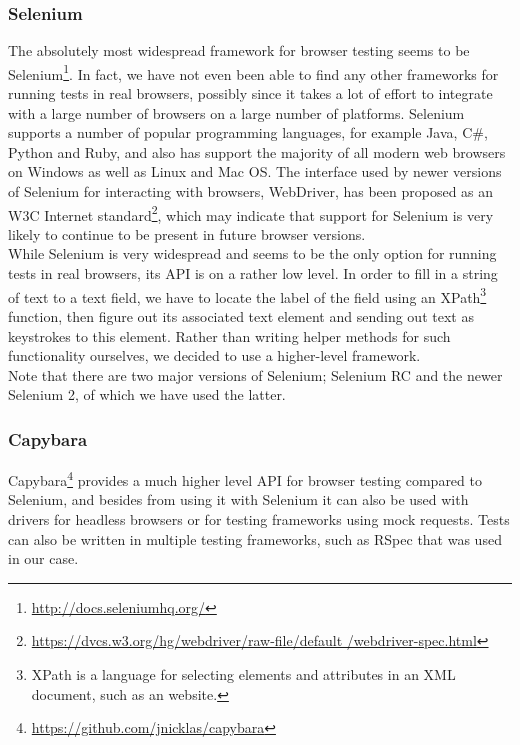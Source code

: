 \label{sec:choices_browser}

\subsubsection{Selenium}
The absolutely most widespread framework for browser testing seems to be
Selenium\footnote{\url{http://docs.seleniumhq.org/}}. In fact, we have
not even been able to find any other frameworks for running tests in
real browsers, possibly since it takes a lot of effort to integrate with
a large number of browsers on a large number of platforms. Selenium
supports a number of popular programming languages, for example Java,
C\#, Python and Ruby, and also has support the majority of all modern web
browsers on Windows as well as Linux and Mac OS. The interface used by
newer versions of Selenium for interacting with browsers, WebDriver, has
been proposed as an W3C Internet
standard\footnote{\url{https://dvcs.w3.org/hg/webdriver/raw-file/default
/webdriver-spec.html}}, which may indicate that support for Selenium
is very likely to continue to be present in future browser versions.
\cite{wiki:selenium}\\

While Selenium is very widespread and seems to be the only option for
running tests in real browsers, its API is on a rather low level. In
order to fill in a string of text to a text field, we have to locate the
label of the field using an XPath\footnote{XPath is a language for
selecting elements and attributes in an XML document, such as an
website.} function, then figure out its associated text element and
sending out text as keystrokes to this element. Rather than writing
helper methods for such functionality ourselves, we decided to use
a higher-level framework.\\

Note that there are two major versions of Selenium; Selenium RC
and the newer Selenium 2, of which we have used the latter.\\

\subsubsection{Capybara}
Capybara\footnote{\url{https://github.com/jnicklas/capybara}} provides a
much higher level API for browser testing compared to Selenium, and
besides from using it with Selenium it can also be used with drivers for
headless browsers or for testing frameworks using mock requests. Tests
can also be written in multiple testing frameworks, such as RSpec that
was used in our case.\\

